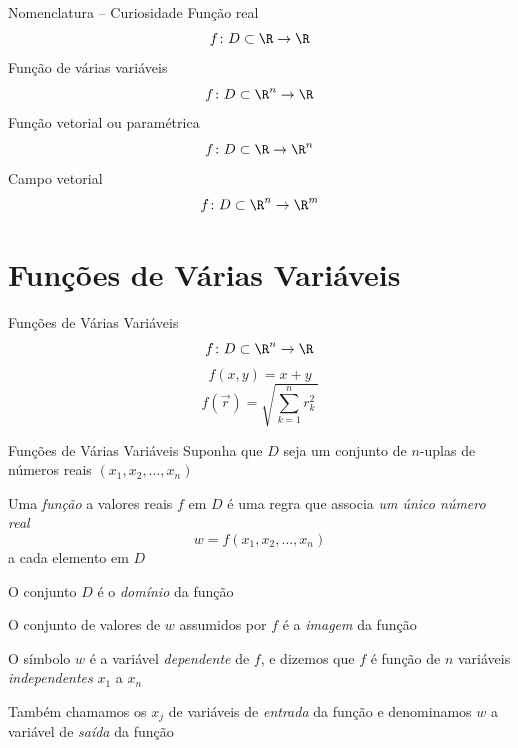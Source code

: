 \documentclass[fleqn,utf8,aspectratio=169,12pt,ignorenonframetext]{beamer}
\begin{document}
\begin{frame}{Nomenclatura -- Curiosidade}
  Função real
  \[
    f\colon D \subset \R \to \R
  \]
  \pause
  Função de várias variáveis
  \[
    f\colon D \subset \R^n \to \R
  \]
  \pause
  Função vetorial ou paramétrica
  \[
    f\colon D \subset \R \to \R^n
  \]
  \pause
  Campo vetorial
  \[
    f\colon D \subset \R^n \to \R^m
  \]
\end{frame}

\section{Funções de Várias Variáveis}

\begin{frame}{Funções de Várias Variáveis}
  \[
    f\colon D \subset \R^n \to \R
  \]
  \pause
  \[
    f(x, y) = x + y
  \]
  \pause
  \[
    f(\vec{r}) = \sqrt{\sum_{k=1}^n r_k^2\,}
  \]
\end{frame}

\begin{frame}{Funções de Várias Variáveis}
  Suponha que $D$ seja um conjunto  de $n$-uplas de números reais
  \((x_1, x_2, \dots, x_n)\)

  \pause
  Uma \emph{função} a valores reais $f$ em $D$ é uma regra que associa
  \emph{um único número real}
  \[
    w = f(x_1, x_2, \dots, x_n)
  \]
  a cada elemento em $D$

  \pause
  O conjunto $D$ é o \emph{domínio} da função

  \pause
  O conjunto de valores de $w$ assumidos por $f$ é a \emph{imagem} da função

  \pause
  O símbolo $w$ é a variável \emph{dependente} de $f$, e dizemos que $f$
  é função de $n$ variáveis \emph{independentes} $x_1$ a $x_n$

  \pause
  Também chamamos os $x_j$ de variáveis de \emph{entrada} da função e
  denominamos $w$ a variável de \emph{saída} da função
\end{frame}

\end{document}
